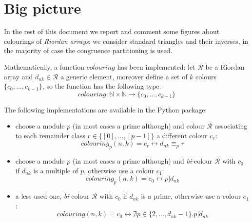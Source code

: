 
\section{Big picture}

In the rest of this document we report and comment some figures
about colourings of \emph{Riordan arrays}: we consider standard triangles
and their inverses, in the majority of case the congruence partitioning
is used.

Mathematically, a function $colouring$ has been implemented: let $\mathcal{R}$ be
a Riordan array and $d_{nk} \in \mathcal{R}$ a generic element, moreover
define a set of $k$ colours $\lbrace c_0, \ldots, c_{k-1} \rbrace$, so
the function has the following type:
\begin{displaymath}
    colouring : \mathbb{N} \times\mathbb{N} \rightarrow 
        \lbrace c_0, \ldots, c_{k-1} \rbrace
\end{displaymath}

The following implementations are available in the Python package:
\begin{itemize}
    \item choose a module $p$ (in most cases a prime although) and
        colour $\mathcal{R}$ associating to each remainder class 
        $r \in \lbrace[0],\ldots,[p-1]\rbrace$
        a different colour $c_r$:
        \begin{displaymath}
            colouring_{p}(n,k) = c_{r} \leftrightarrow d_{nk} \equiv_{p} r
        \end{displaymath}
    \item choose a module $p$ (in most cases a prime although) and
        \emph{bi}-colour $\mathcal{R}$ with $c_0$ if $d_{nk}$ 
        is a multiple of $p$, otherwise use a colour $c_1$:
        \begin{displaymath}
            colouring_{p}(n,k) = c_{0} \leftrightarrow p | d_{nk}
        \end{displaymath}
    \item a less used one, \emph{bi}-colour $\mathcal{R}$ with $c_0$ 
        if $d_{nk}$ is a prime, otherwise use a colour $c_1$:
        \begin{displaymath}
            colouring(n,k) = c_{0} \leftrightarrow 
                \nexists p\in\lbrace 2,\ldots,d_{nk}-1\rbrace.p|d_{nk} 
        \end{displaymath}
\end{itemize}
